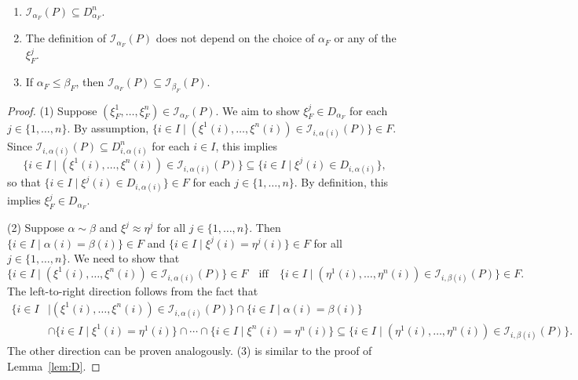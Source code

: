 \documentclass[submission,copyright,creativecommons]{eptcs}
\renewcommand{\iff}{\quad\text{iff}\quad}
\newcommand{\II}{\mathscr{I}}
\begin{document}
\begin{lemma}\label{lem:B3} \
  \begin{enumerate}
    \item $\II_{\alpha_F}(P) \subseteq D^n_{\alpha_F}$.
    \item The definition of $\II_{\alpha_F}(P)$ does not depend on the
          choice of $\alpha_F$ or any of the $\xi^j_F$.
    \item If $\alpha_F \leq \beta_F$, then
          $\II_{\alpha_F}(P) \subseteq \II_{\beta_F}(P)$.
  \end{enumerate}
\end{lemma}
\begin{proof}
  (1) \; Suppose $(\xi_F^1, \ldots, \xi_F^n) \in \II_{\alpha_F}(P)$.
  We aim to show $\xi_F^j \in D_{\alpha_F}$ for each $j \in \{ 1, \ldots, n \}$.
  By assumption,
  $\{ i \in I \mid (\xi^1(i), \ldots, \xi^n(i)) \in \II_{i, \alpha(i)}(P) \} \in F$.
  Since $\II_{i, \alpha(i)}(P) \subseteq D^n_{i,\alpha(i)}$ for each $i \in I$,
  this implies
  \begin{equation*}
    \{ i \in I \mid (\xi^1(i), \ldots, \xi^n(i)) \in \II_{i, \alpha(i)}(P) \}
      \subseteq  \{ i \in I \mid \xi^j(i) \in D_{i,\alpha(i)}\},
  \end{equation*}
  so that $\{ i \in I \mid \xi^j(i) \in D_{i, \alpha(i)} \} \in F$ for each
  $j \in \{ 1, \ldots, n \}$. By definition, this implies $\xi^j_F \in D_{\alpha_F}$.

  (2) \; Suppose $\alpha \sim \beta$ and $\xi^j \approx \eta^j$ for
  all $j \in \{ 1, \ldots, n \}$.
  Then $\{ i \in I \mid \alpha(i) = \beta(i) \} \in F$ and
  $\{ i \in I \mid \xi^j(i) = \eta^j(i) \} \in F$ for all $j \in \{ 1, \ldots, n \}$.
  We need to show that
  \begin{equation*}
    \{i \in I \mid (\xi^1(i), \ldots, \xi^n(i)) \in \II_{i,\alpha(i)}(P) \} \in F
    \iff
    \{i \in I \mid (\eta^1(i), \ldots, \eta^n(i)) \in \II_{i,\beta(i)}(P) \} \in F.
  \end{equation*}
  The left-to-right direction follows from the fact that
  \begin{align*}
    \{i \in I &\mid (\xi^1(i), \ldots, \xi^n(i)) \in \II_{i,\alpha(i)}(P) \}
      \cap \{ i \in I \mid \alpha(i) = \beta(i) \} \\
      &\cap \{ i \in I \mid \xi^1(i) = \eta^1(i) \} 
      \cap \cdots \cap \{ i \in I \mid \xi^n(i) = \eta^n(i) \}
      \subseteq \{i \in I \mid (\eta^1(i), \ldots, \eta^n(i)) \in \II_{i,\beta(i)}(P) \}.
  \end{align*}
  The other direction can be proven analogously.
  (3) is similar to the proof of Lemma~\ref{lem:D}.
\end{proof}
\end{document}

